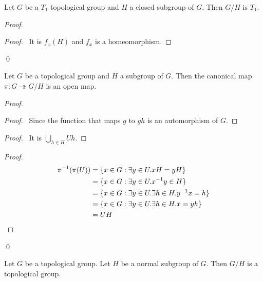 \begin{prop}
Let $G$ be a $T_1$ topological group and $H$ a closed subgroup of $G$. Then $G/H$ is $T_1$.
\end{prop}

\begin{proof}
\pf
{}
\begin{proof}
	\pf\ It is $f_x(H)$ and $f_x$ is a homeomorphism.
\end{proof}
\qed
\end{proof}

\begin{prop}
\label{prop:pi_open_map}
Let $G$ be a topological group and $H$ a subgroup of $G$. Then the canonical map $\pi : G \twoheadrightarrow G / H$ is an open map.
\end{prop}

\begin{proof}
\pf
{}
\begin{proof}
	\pf\ Since the function that maps $g$ to $gh$ is an automorphism of $G$.
\end{proof}
\begin{proof}
	\pf\ It is $\bigcup_{h \in H} Uh$.
\end{proof}
\begin{proof}
	\pf
	\begin{align*}
		{\pi}^{-1}(\pi(U)) & = \{ x \in G : \exists y \in U. xH = yH \} \\
		& = \{ x \in G : \exists y \in U. {x}^{-1} y \in H \} \\
		& = \{ x \in G : \exists y \in U. \exists h \in H. {y}^{-1} x= h \} \\
		& = \{ x \in G : \exists y \in U. \exists h \in H. x = yh \} \\
		& = UH
	\end{align*}
\end{proof}
\qed
\end{proof}

\begin{prop}
Let $G$ be a topological group. Let $H$ be a normal subgroup of $G$. Then $G / H$ is a topological group.
\end{prop}

